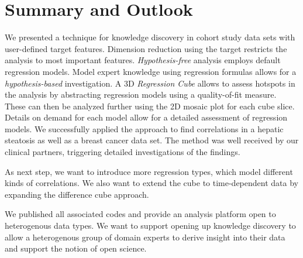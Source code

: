 \documentclass[journal]{style/vgtc} 			          %
\begin{document}
\section{Summary and Outlook}
We presented a technique for knowledge discovery in cohort study data sets with user-defined target features.
Dimension reduction using the target restricts the analysis to most important features.
\emph{Hypothesis-free} analysis employs default regression models.
Model expert knowledge using regression formulas allows for a \emph{hypothesis-based} investigation.
A 3D \emph{Regression Cube} allows to assess hotspots in the analysis by abstracting regression models using a quality-of-fit measure.
These can then be analyzed further using the 2D mosaic plot for each cube slice.
Details on demand for each model allow for a detailed assessment of regression models.
We successfully applied the approach to find correlations in a hepatic steatosis as well as a breast cancer data set.
The method was well received by our clinical partners, triggering detailed investigations of the findings.

As next step, we want to introduce more regression types, which model different kinds of correlations.
We also want to extend the cube to time-dependent data by expanding the difference cube approach.

We published all associated codes and provide an analysis platform open to heterogenous data types.
We want to support opening up knowledge discovery to allow a heterogenous group of domain experts to derive insight into their data and support the notion of open science.
\end{document}
